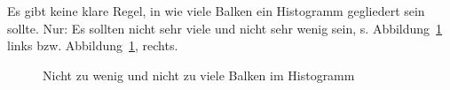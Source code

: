 \documentclass[
  letterpaper,
]{scrbook}
\theoremstyle{definition}
\theoremstyle{definition}
\theoremstyle{definition}
\theoremstyle{remark}
\begin{document}
Es gibt keine klare Regel, in wie viele Balken ein Histogramm gegliedert
sein sollte. Nur: Es sollten nicht sehr viele und nicht sehr wenig sein,
s. Abbildung~\ref{fig-zu-wenig-viele} links bzw.
Abbildung~\ref{fig-zu-wenig-viele}, rechts.

\begin{figure}

\begin{minipage}{0.50\linewidth}



\end{minipage}%
%
\begin{minipage}{0.50\linewidth}



\end{minipage}%

\caption{\label{fig-zu-wenig-viele}Nicht zu wenig und nicht zu viele
Balken im Histogramm}

\end{figure}%
\end{document}
